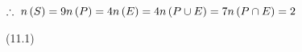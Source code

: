 {\begin{mdframed}[linewidth=4, leftmargin=40, rightmargin=40]
\begin{exercise}
\begin{enumerate}[noitemsep, label=\textbf{Step} \textbf{\arabic*}. ]
{\begin{equation}
      \end{equation}
    }{%
    \setlength{\mymathboxwidth}{\columnwidth}
      \addtolength{\mymathboxwidth}{-48pt}
    \par\vspace{12pt}\noindent\begin{minipage}{\columnwidth}
    \parbox[t]{\mymathboxwidth}{\large$
    \therefore \phantom{\rule{0.166667em}{0ex}}\phantom{\rule{0.166667em}{0ex}}n\left(S\right)=9n\left(P\right)=4n\left(E\right)=4n\left(P\cup E\right)=7n\left(P\cap E\right)=2$}\hfill
    \parbox[t]{48pt}{\raggedleft 
    (11.1)}
    \end{minipage}\vspace{12pt}\par
    }%
          \end{enumerate}
    \end{exercise}
    \end{mdframed}
    }
    \noindent
  \par
            \label{m39377*eip-756}\vspace{.5cm} 
      \noindent
